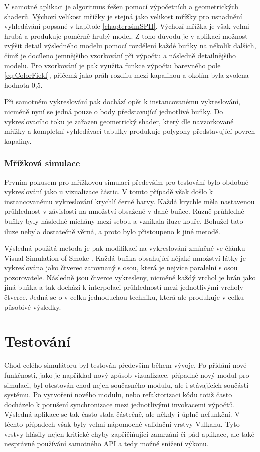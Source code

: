 V samotné aplikaci je algoritmus řešen pomocí výpočetních a geometrických shaderů. Výchozí velikost mřížky je stejná jako velikost mřížky pro usnadnění vyhledávání popsané v kapitole \ref{chapter:simSPH}. Výchozí mřížka je však velmi hrubá a produkuje poměrně hrubý model. Z toho důvodu je v aplikaci možnost zvýšit detail výsledného modelu pomocí rozdělení každé buňky na několik dalších, čímž je docíleno jemnějšího vzorkování při výpočtu a následně detailnějšího modelu. Pro vzorkování je pak využita funkce výpočtu barevného pole \ref{eq:ColorField}, přičemž jako práh rozdílu mezi kapalinou a okolím byla zvolena hodnota 0,5. \cite{renderingSPH}

Při samotném vykreslování pak dochází opět k instancovanému vykreslování, nicméně nyní se jedná pouze o body představující jednotlivé buňky. Do vykreslovacího toku je zařazen geometrický shader, který dle navzorkované mřížky a kompletní vyhledávací tabulky produkuje polygony představující povrch kapaliny.

\subsection{Mřížková simulace}
\label{chapter:vizGrid}
Prvním pokusem pro mřížkovou simulaci především pro testování bylo obdobné vykreslování jako u vizualizace částic. V tomto případě však došlo k instancovanému vykreslování krychlí černé barvy. Každá krychle měla nastavenou průhlednost v závislosti na množství obsažené v dané buňce. Různě průhledné buňky byly následně míchány mezi sebou a vznikala iluze kouře. Bohužel tato iluze nebyla dostatečně věrná, a proto bylo přistoupeno k jiné metodě.

Výsledná použitá metoda je pak modifikací na vykreslování zmíněné ve článku Visual Simulation of Smoke \cite{visualSmoke}. Každá buňka obsahující nějaké množství látky je vykreslována jako čtverec zarovnaný s osou, která je nejvíce paralelní s osou pozorovatele. Následně jsou čtverce vykresleny, nicméně každý vrchol je brán jako jiná buňka a tak dochází k interpolaci průhledností mezi jednotlivými vrcholy čtverce. Jedná se o v celku jednoduchou techniku, která ale produkuje v celku působivé výsledky.


\chapter{Testování}
\label{chapter:testovani}
Chod celého simulátoru byl testován především během vývoje. Po přidání nové funkčnosti, jako je například nový způsob vizualizace, případně nový modul pro simulaci, byl otestován chod nejen současného modulu, ale i stávajících součástí systému. Po vytvoření nového modulu, nebo refaktorizaci kódu totiž často docházelo k porušení synchronizace mezi jednotlivými invokacemi výpočtů. Výsledná aplikace se tak často stala částečně, ale někdy i úplně nefunkční. V těchto případech však byly velmi nápomocné validační vrstvy Vulkanu. Tyto vrstvy hlásily nejen kritické chyby zapřičiňující zamrzání či pád aplikace, ale také nesprávné používání samotného API a tedy možné snížení výkonu.


